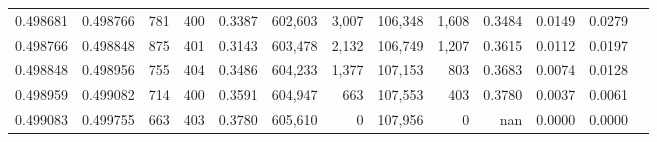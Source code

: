 \begin{tabular}{rrrrrrrrrrrrr}
0.498681 & 0.498766 &   781 & 400 &                                     0.3387 & 602,603 &   3,007 & 106,348 &   1,608 & 0.3484 & 0.0149 & 0.0279 \\
0.498766 & 0.498848 &   875 & 401 &                                     0.3143 & 603,478 &   2,132 & 106,749 &   1,207 & 0.3615 & 0.0112 & 0.0197 \\
0.498848 & 0.498956 &   755 & 404 &                                     0.3486 & 604,233 &   1,377 & 107,153 &     803 & 0.3683 & 0.0074 & 0.0128 \\
0.498959 & 0.499082 &   714 & 400 &                                     0.3591 & 604,947 &     663 & 107,553 &     403 & 0.3780 & 0.0037 & 0.0061 \\
0.499083 & 0.499755 &   663 & 403 &                                     0.3780 & 605,610 &       0 & 107,956 &       0 &    nan & 0.0000 & 0.0000 \\
\bottomrule
\end{tabular}
